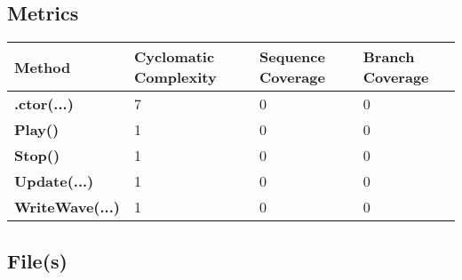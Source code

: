 \documentclass[a4paper,10pt]{article}
\begin{document}
\subsection{Metrics}
\begin{longtable}[l]{|l|l|l|l|}
\hline
\textbf{Method} & \textbf{Cyclomatic Complexity} & \textbf{Sequence Coverage} & \textbf{Branch Coverage}\\
\hline
\textbf{.ctor(...)} & 7 & 0 & 0\\
\hline
\textbf{Play()} & 1 & 0 & 0\\
\hline
\textbf{Stop()} & 1 & 0 & 0\\
\hline
\textbf{Update(...)} & 1 & 0 & 0\\
\hline
\textbf{WriteWave(...)} & 1 & 0 & 0\\
\hline
\end{longtable}
\subsection{File(s)}
\end{document}
